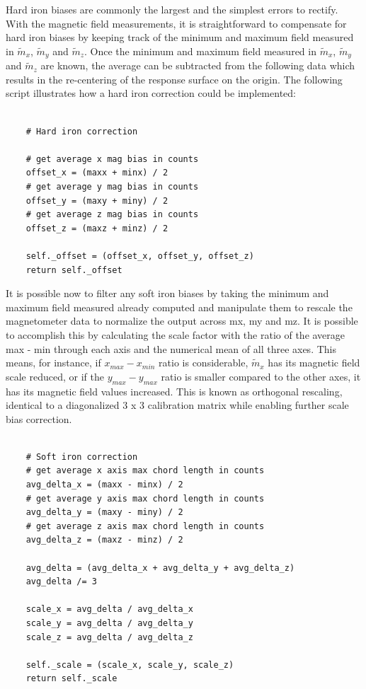 Hard iron biases are commonly the largest and the simplest errors to rectify. With the magnetic field measurements, it is straightforward to compensate for hard iron biases by keeping track of the minimum and maximum field measured in $\widetilde{m}_x$, $\widetilde{m}_y$ and $\widetilde{m}_z$. Once the minimum and maximum field measured in $\widetilde{m}_x$, $\widetilde{m}_y$ and $\widetilde{m}_z$ are known, the average can be subtracted from the following data which results in the re-centering of the response surface on the origin. The following script illustrates how a hard iron correction could be implemented:

\lstset{language=Python}
\begin{lstlisting}[frame=single]  % Start your code-block

    # Hard iron correction

    # get average x mag bias in counts
    offset_x = (maxx + minx) / 2
    # get average y mag bias in counts
    offset_y = (maxy + miny) / 2
    # get average z mag bias in counts
    offset_z = (maxz + minz) / 2

    self._offset = (offset_x, offset_y, offset_z)
    return self._offset
\end{lstlisting}

It is possible now to filter any soft iron biases by taking the minimum and maximum field measured already computed and manipulate them to rescale the magnetometer data to normalize the output across mx, my and mz. It is possible to accomplish this by calculating the scale factor with the ratio of the average max - min through each axis and the numerical mean of all three axes. This means, for instance, if $x_{max} - x_{min}$ ratio is considerable, $\widetilde{m}_x$ has its magnetic field scale reduced, or if the $y_{max} - y_{max}$ ratio is smaller compared to the other axes, it has its magnetic field values increased. This is known as orthogonal rescaling, identical to a diagonalized 3 x 3 calibration matrix while enabling further scale bias correction.

\lstset{language=Python}
\begin{lstlisting}[frame=single]  % Start your code-block

    # Soft iron correction
    # get average x axis max chord length in counts
    avg_delta_x = (maxx - minx) / 2
    # get average y axis max chord length in counts
    avg_delta_y = (maxy - miny) / 2
    # get average z axis max chord length in counts
    avg_delta_z = (maxz - minz) / 2

    avg_delta = (avg_delta_x + avg_delta_y + avg_delta_z)
    avg_delta /= 3

    scale_x = avg_delta / avg_delta_x
    scale_y = avg_delta / avg_delta_y
    scale_z = avg_delta / avg_delta_z

    self._scale = (scale_x, scale_y, scale_z)
    return self._scale

\end{lstlisting}

